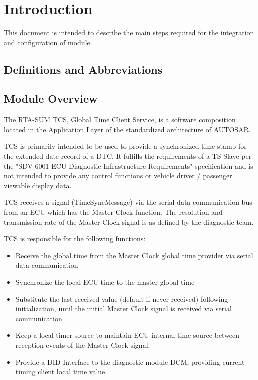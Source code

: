 \chapter{Introduction}

This document is intended to describe the main steps required for the integration and configuration of \LongName module.

\section{Definitions and Abbreviations}


\section{Module Overview}
The RTA-SUM TCS, Global Time Client Service, is a software composition located in
the Application Layer of the standardized architecture of AUTOSAR.


TCS is primarily intended to be used to provide a synchronized time stamp for the extended date
record of a DTC. It fulfills the requirements of a TS Slave per the "SDV-6001 ECU Diagnostic
Infrastructure Requirements" specification and is not intended to provide any control functions
or vehicle driver / passenger viewable display data.


TCS receives a signal (TimeSyncMessage) via the serial data communication bus from an ECU
which has the Master Clock function. The resolution and transmission rate of the Master Clock signal is
as defined by the diagnostic team.


TCS is responsible for the following functions:
\begin{itemize}
\item Receive the global time from the Master Clock global time provider via serial data
communication
\item Synchronize the local ECU time to the master global time
\item Substitute the last received value (default if never received) following initialization, until the
initial Master Clock signal is received via serial communication
\item Keep a local timer source to maintain ECU internal time source between reception events of the Master Clock signal.
\item Provide a DID Interface to the diagnostic module DCM, providing current timing client local time value.
\end{itemize}

